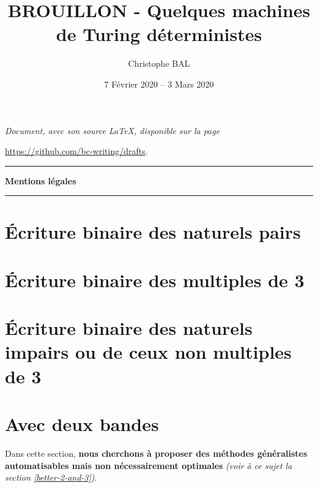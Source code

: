 \documentclass[a4paper, 12pt]{scrartcl}
\begin{document}
\title{BROUILLON - Quelques machines de Turing déterministes}
\author{Christophe BAL}
\date{7 Février 2020 -- 3 Mars 2020}

\maketitle

\begin{center}
	\itshape
	Document, avec son source \LaTeX, disponible sur la page
	
	\url{https://github.com/bc-writing/drafts}.
\end{center}


\bigskip


\begin{center}
	\hrule\vspace{.3em}
	{
		\fontsize{1.35em}{1em}\selectfont
		\textbf{Mentions \og légales \fg}
	}
			
	\vspace{0.45em}
	\doclicenseThis
	\hrule
\end{center}


\bigskip
\setcounter{tocdepth}{2}
\tableofcontents



\newpage
\section{Écriture binaire des naturels pairs}

	


\newpage
\section{Écriture binaire des multiples de 3} \label{divisibility-by-3}

	


\newpage
\section{Écriture binaire des naturels impairs ou de ceux non multiples de 3}

	


\newpage
\section{Avec deux bandes}

	Dans cette section, \textbf{nous cherchons à proposer des méthodes généralistes automatisables mais non nécessairement optimales}
	\emph{(voir à ce sujet la section \ref{better-2-and-3})}.
\end{document}
